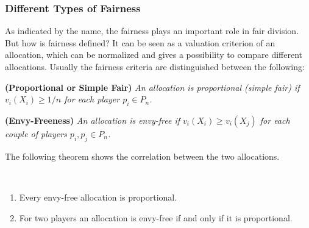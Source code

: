 \subsubsection{Different Types of Fairness}
As indicated by the name, the fairness plays an important role in fair division. But how is fairness defined? It can be seen as a valuation criterion of an allocation, which can be normalized and gives a possibility to compare different allocations. Usually the fairness criteria are distinguished between the following:
\begin{defi}{\textbf{(Proportional or Simple Fair)}}
\newline \emph{An allocation is \emph{proportional (simple fair)} if
$v_i(X_i) \geq 1/n$ for each player $p_i \in P_n$.}
\end{defi}
\begin{defi}{\textbf{(Envy-Freeness)}}
\newline \emph{An allocation is \emph{envy-free} if $v_i(X_i) \geq
v_i(X_j)$ for each couple of players $p_i, p_j \in P_n$.}
\end{defi}
\vsp
%
%
The following theorem shows the correlation between the two allocations.
%
\begin{lem}
\textcolor{white}{x}
\begin{enumerate}
\item Every envy-free allocation is proportional.
\item For two players an allocation is envy-free if and only if it is proportional.
\end{enumerate}
\end{lem}
